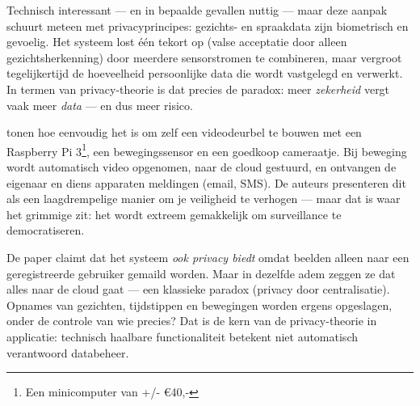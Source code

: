 \documentclass[nonacm, sigconf]{acmart}
\begin{document}

    \noindent
    Technisch interessant — en in bepaalde gevallen nuttig — maar deze aanpak schuurt meteen met privacyprincipes: gezichts- en spraakdata zijn biometrisch en gevoelig. Het systeem lost één tekort op (valse acceptatie door alleen gezichtsherkenning) door meerdere sensorstromen te combineren, maar vergroot tegelijkertijd de hoeveelheid persoonlijke data die wordt vastgelegd en verwerkt. In termen van privacy-theorie is dat precies de paradox: meer \emph{zekerheid} vergt vaak meer \emph{data} — en dus meer risico.

    \bigskip


    \parencite{lalitha2019smart} tonen hoe eenvoudig het is om zelf een videodeurbel te bouwen met een Raspberry Pi 3\footnote{Een minicomputer van +/- €40,-}, een bewegingssensor en een goedkoop cameraatje. Bij beweging wordt automatisch video opgenomen, naar de cloud gestuurd, en ontvangen de eigenaar en diens apparaten meldingen (email, SMS). De auteurs presenteren dit als een laagdrempelige manier om je veiligheid te verhogen — maar dat is waar het grimmige zit: het wordt extreem gemakkelijk om surveillance te democratiseren.

    \noindent
    De paper claimt dat het systeem \emph{ook privacy biedt} omdat beelden alleen naar een geregistreerde gebruiker gemaild worden. Maar in dezelfde adem zeggen ze dat alles naar de cloud gaat — een klassieke paradox (privacy door centralisatie). Opnames van gezichten, tijdstippen en bewegingen worden ergens opgeslagen, onder de controle van wie precies? Dat is de kern van de privacy-theorie in applicatie: technisch haalbare functionaliteit betekent niet automatisch verantwoord databeheer.
\end{document}
